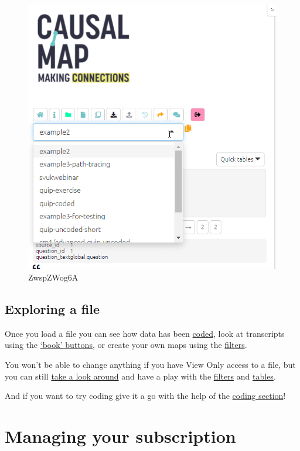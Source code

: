 \documentclass[
]{book}
\begin{document}
\begin{figure}
\centering
\includegraphics[width=6.77083in,height=\textheight]{_assets/ZwspZWog6A.gif}
\caption{ZwspZWog6A}
\end{figure}

\hypertarget{exploring-a-file}{%
\section{Exploring a file}\label{exploring-a-file}}

Once you load a file you can see how data has been \protect\hyperlink{xcoding-panel}{coded}, look at transcripts using the \protect\hyperlink{xstatement-nav}{`book' buttons}, or create your own maps using the \href{xintro-filters}{filters}.

You won't be able to change anything if you have View Only access to a file, but you can still \protect\hyperlink{quick-tour}{take a look around} and have a play with the \protect\hyperlink{xintro-filters}{filters} and \href{x\#all-tables}{tables}.

And if you want to try coding give it a go with the help of the \protect\hyperlink{xcoding-panel}{coding section}!

\hypertarget{xmanage_your_subscription}{%
\chapter{Managing your subscription}\label{xmanage_your_subscription}}
\end{document}
